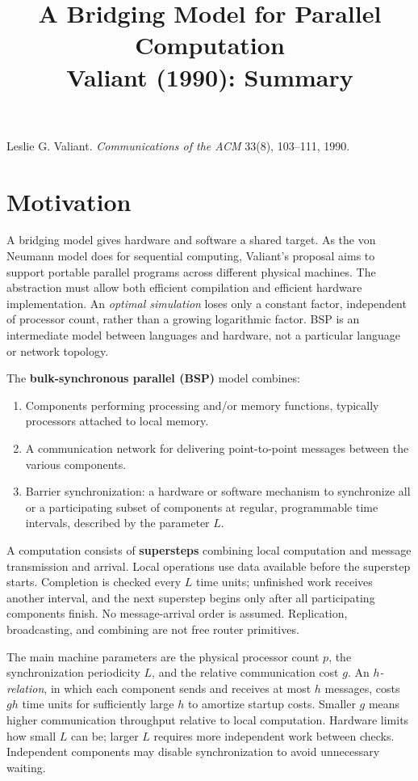 \documentclass[11pt,a4paper]{article}
\title{A Bridging Model for Parallel Computation\\[0.3em]
\large Valiant (1990): Summary}
\author{}
\date{}
\newcommand{\topic}[1]{\section*{#1}}
\begin{document}
\maketitle
\vspace{-2.7em}
{\small Leslie G. Valiant. \emph{Communications of the ACM} 33(8), 103--111, 1990.}

\topic{Motivation}
A bridging model gives hardware and software a shared target. As the von
Neumann model does for sequential computing, Valiant's proposal aims to
support portable parallel programs across different physical machines.
The abstraction must allow both efficient compilation and efficient hardware
implementation. An \emph{optimal simulation} loses only a constant factor,
independent of processor count, rather than a growing logarithmic factor.
BSP is an intermediate model between languages and hardware, not a particular
language or network topology.

The \textbf{bulk-synchronous parallel (BSP)} model combines:
\begin{enumerate}
  \item Components performing processing and/or memory functions, typically
        processors attached to local memory.
  \item A communication network for delivering point-to-point messages
        between the various components.
  \item Barrier synchronization: a hardware or software mechanism to
        synchronize all or a participating subset of components at regular, programmable time intervals,
        described by the parameter $L$.
\end{enumerate}

A computation consists of \textbf{supersteps} combining local computation
and message transmission and arrival. Local operations use data available
before the superstep starts. Completion is checked every $L$ time units;
unfinished work receives another interval, and the next superstep begins
only after all participating components finish. No message-arrival order
is assumed. Replication, broadcasting, and combining are not free router primitives.

The main machine parameters are the physical processor count $p$, the
synchronization periodicity $L$, and the relative communication cost $g$.
An \emph{$h$-relation}, in which each component sends and receives at most
$h$ messages, costs $gh$ time units for sufficiently large $h$ to amortize
startup costs. Smaller $g$ means higher communication throughput relative
to local computation. Hardware limits how small $L$ can be; larger $L$
requires more independent work between checks. Independent components
may disable synchronization to avoid unnecessary waiting.
\end{document}
